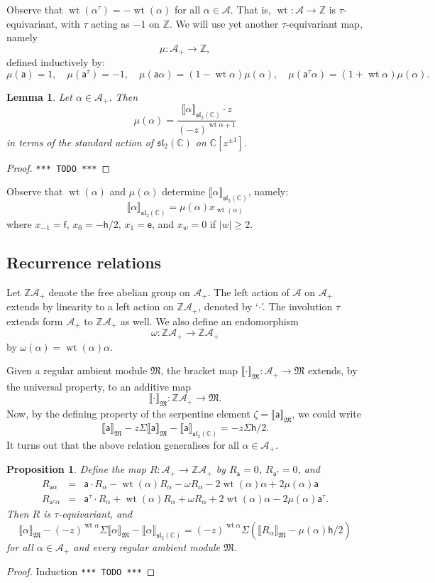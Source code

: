 \documentclass{article}
\def\MISS{\texttt{*** TODO ***}}
\def\llb{\llbracket}
\def\rrb{\rrbracket}
\def\fsl{\mathfrak{sl}}
\def\fM{\mathfrak{M}}
\def\sA{\mathscr{A}}
\def\ZZ{\mathbb{Z}}
\def\CC{\mathbb{C}}
\def\inv{\tau} %
\DeclareMathOperator{\wt}{\mathrm{wt}}
\def\a{\mathsf{a}}
\def\e{\mathsf{e}}
\def\h{\mathsf{h}}
\def\f{\mathsf{f}}
\def\R{R}
\newtheorem{lem}{Lemma}
\newtheorem{prop}{Proposition}
\theoremstyle{definition}
\begin{document}
Observe that $\wt(\alpha^\inv) = -\wt(\alpha)$ for
all $\alpha\in\sA$. That is, $\wt:\sA\to\ZZ$ is $\inv$-equivariant,
with $\inv$ acting as $-1$ on $\ZZ$.
We will use yet another $\inv$-equivariant map, namely
$$ \mu : \sA_+ \to \ZZ,$$
defined inductively by:
$$
\mu(\a)=1,\quad\mu(\a^\inv)=-1,\quad \mu(\a\alpha) = (1-\wt\alpha)\mu(\alpha),\quad
\mu(\a^\inv\alpha) = (1 + \wt\alpha)\mu(\alpha).
$$
\begin{lem}
        Let $\alpha \in \sA_+$. Then
        $$
         \mu(\alpha) = \frac{\llb\alpha\rrb_{\fsl_2(\CC)} \cdot z}{(-z)^{\wt\alpha + 1}}
        $$
        in terms of the standard action of $\fsl_2(\CC)$ on $\CC[z^{\pm1}]$.
\end{lem}

\begin{proof}\MISS\end{proof}

Observe that $\wt(\alpha)$ and $\mu(\alpha)$ determine $\llb\alpha\rrb_{\fsl_2(\CC)}$, namely:
$$
\llb\alpha\rrb_{\fsl_2(\CC)} = \mu(\alpha) x_{\wt(\alpha)}
$$
where
$x_{-1}=\f$, $x_0 = -\h/2$, $x_1 = \e$,
and $x_w=0$ if $|w|\ge2$.

\subsection{Recurrence relations}

Let $\ZZ\sA_+$ denote the free abelian group on $\sA_+$.
The left action of $\sA$ on $\sA_+$ extends by linearity
to a left action on $\ZZ\sA_+$, denoted by `$\cdot$'. The
involution $\inv$ extends form $\sA_+$ to $\ZZ\sA_+$ as well.
We also define an endomorphism
$$ \omega : \ZZ\sA_+ \to \ZZ\sA_+ $$
by $\omega(\alpha)=\wt(\alpha)\alpha$.

Given a regular ambient module $\fM$,
the bracket map $\llb\cdot\rrb_\fM : \sA_+ \to \fM$
extends, by the universal property, to an additive map
$$ \llb \cdot \rrb_\fM : \ZZ\sA_+ \to \fM. $$
Now, by the defining property of the serpentine element $\zeta = \llb \a\rrb_\fM$, we could write
$$
\llb \a \rrb_\fM - z\Sigma\llb \a\rrb_\fM - \llb \a\rrb_{\fsl_2(\CC)} = - z\Sigma \h/2.
$$
It turns out that the above relation generalises
for all $\alpha \in \sA_+$.

\begin{prop}\label{pro:rests}
Define the map $\R : \sA_+ \to \ZZ\sA_+$ by 
$\R_\a = 0$, $\R_{\a^\inv} = 0$, and
\begin{eqnarray*}
        \R_{\a\alpha} &=& \a\cdot \R_\alpha - \wt(\alpha) \R_\alpha - \omega \R_\alpha - 2\wt(\alpha)\alpha
        + 2\mu(\alpha)\a \\
        \R_{\a^\inv\alpha} &=& \a^\inv\cdot \R_\alpha + \wt(\alpha) \R_\alpha + \omega \R_\alpha + 2\wt(\alpha)\alpha
        - 2\mu(\alpha)\a^\inv.
\end{eqnarray*}
Then $\R$ is $\inv$-equivariant, and
$$
\llb \alpha\rrb_\fM - (-z)^{\wt\alpha} \Sigma \llb \alpha\rrb_\fM - \llb\alpha\rrb_{\fsl_2(\CC)}
= (-z)^{\wt\alpha} \Sigma\left( \llb\R_\alpha\rrb_\fM - \mu(\alpha)\h/2 \right)
$$
for all $\alpha\in\sA_+$ and every regular ambient module $\fM$.
\end{prop}
\begin{proof}
Induction \MISS
\end{proof}
\end{document}
